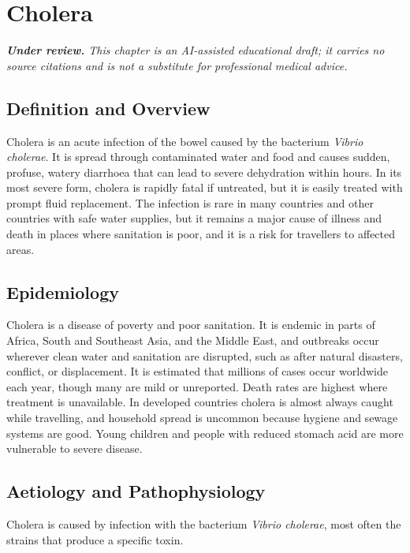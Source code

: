 \chapter{Cholera}

\medskip
\noindent\textit{\textbf{Under review.} This chapter is an AI-assisted educational draft; it carries no source citations and is not a substitute for professional medical advice.}

\section*{Definition and Overview}
Cholera is an acute infection of the bowel caused by the bacterium \textit{Vibrio cholerae}. It is spread through contaminated water and food and causes sudden, profuse, watery diarrhoea that can lead to severe dehydration within hours. In its most severe form, cholera is rapidly fatal if untreated, but it is easily treated with prompt fluid replacement. The infection is rare in many countries and other countries with safe water supplies, but it remains a major cause of illness and death in places where sanitation is poor, and it is a risk for travellers to affected areas.

\section*{Epidemiology}
Cholera is a disease of poverty and poor sanitation. It is endemic in parts of Africa, South and Southeast Asia, and the Middle East, and outbreaks occur wherever clean water and sanitation are disrupted, such as after natural disasters, conflict, or displacement. It is estimated that millions of cases occur worldwide each year, though many are mild or unreported. Death rates are highest where treatment is unavailable. In developed countries cholera is almost always caught while travelling, and household spread is uncommon because hygiene and sewage systems are good. Young children and people with reduced stomach acid are more vulnerable to severe disease.

\section*{Aetiology and Pathophysiology}
Cholera is caused by infection with the bacterium \textit{Vibrio cholerae}, most often the strains that produce a specific toxin.

